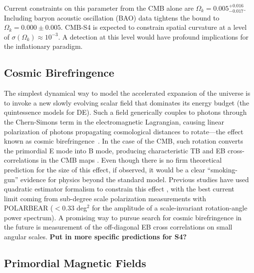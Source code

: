Current constraints on this parameter from the CMB alone are $\Omega_k= 0.005^{+0.016}_{-0.017}$. Including baryon acoustic oscillation (BAO) data tightens the bound to $\Omega_k=0.000\pm0.005$. CMB-S4 is expected to constrain spatial curvature at a level of $\sigma(\Omega_k)\approx 10^{-3}$. A detection at this level would have profound implications for the inflationary paradigm. 

\subsection{Cosmic Birefringence}
The simplest dynamical way to model the accelerated expansion of the universe is to invoke a new slowly evolving scalar field that dominates its energy budget (the quintessence models for DE). Such a field generically couples to photons through the Chern-Simons term in the electromagnetic Lagrangian, causing linear polarization of photons propagating cosmological distances to rotate---the effect known as cosmic birefringence~\cite{1998PhRvL..81.3067C}. In the case of the CMB, such rotation converts the primordial E mode into B mode, producing characteristic TB and EB cross-correlations in the CMB maps \cite{2009PhRvL.102k1302K,2009PhRvD..80b3510G}. Even though there is no firm theoretical prediction for the size of this effect, if observed, it would be a clear “smoking-gun” evidence for physics beyond the standard model. Previous studies have used quadratic estimator formalism to constrain this effect \cite{2012PhRvD..86j3529G}, with the best current limit coming from sub-degree scale polarization measurements with POLARBEAR \cite{Ade:2015cao} ($<0.33$ deg$^2$ for the amplitude of a scale-invariant rotation-angle power spectrum). A promising way to pursue search for cosmic birefringence in the future is measurement of the off-diagonal EB cross correlations on small angular scales. {\bf Put in more specific predictions for S4?}

\subsection{Primordial Magnetic Fields}

